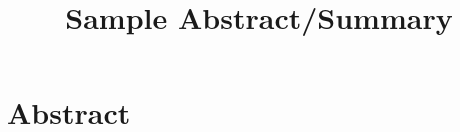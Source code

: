 \documentclass{article}
\title{Sample Abstract/Summary}
\author{}
\date{}
\begin{document}
	
	\maketitle
	
	\section*{Abstract} 
	\lipsum[1]
	
	\vspace{0.5cm}
	
    \lipsum[3]
	
\end{document}
